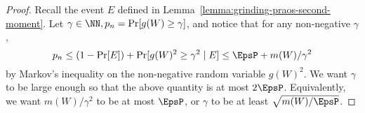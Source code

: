 \begin{proof}
  Recall the event $E$ defined in Lemma~\ref{lemma:grinding-praos-second-moment}.
  Let $\gamma \in \NN, p_n = \Pr[g(W) \geq \gamma]$, and 
  notice that for any non-negative $\gamma$, 
  $$
    p_n 
    \leq (1 - \Pr[E]) + \Pr[g(W)^2 \geq \gamma^2 \mid E] 
    \leq \EpsP + m(W)/\gamma^2
  $$ 
  by Markov's inequality on the non-negative random variable $g(W)^2$. 
  We want $\gamma$ to be large enough so that the above quantity is at most $2 \EpsP$. 
  Equivalently, 
  we want $m(W)/\gamma^2$ to be at most $\EpsP$, or $\gamma$ to be at least $\sqrt{m(W)/\EpsP}$. 




\end{proof}
